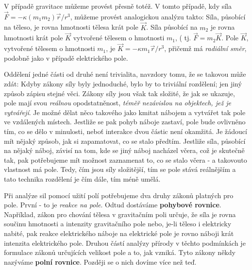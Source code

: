     V případě gravitace můžeme provést přesně totéž. V tomto případě, kdy síla \(\vec{F} = - \kappa 
    (m_1m_2)\vec{r}/r^3\), můžeme provést analogickou analýzu takto: Síla, působící na těleso, je 
    rovna hmotnosti tělesa krát pole \(\vec{K}\). Síla působící na \(m_2\) je rovna hmotnosti krát 
    pole \(\vec{K}\) vytvořené tělesem o hmotnosti \(m_1\), ( tj. \(\vec{F}=m_2\vec{K}\). Pole 
    \(\vec{K}\), vytvořené tělesem o hmotnosti \(m_1\), je \(\vec{K}= -\kappa m_1\vec{r}/r^3\), 
    přičemž má \emph{radiální směr}, podobně jako v případě elektrického pole.
    
    Oddělení jedné části od druhé není trivialita, navzdory tomu, že se takovou může zdát: Kdyby 
    zákony síly byly jednoduché, bylo by to triviální rozdělení; jen jiný způsob zápisu stejné 
    věci. Zákony síly jsou však tak složité, že jak se ukazuje, pole mají svou \emph{reálnou} 
    opodstatněnost, \emph{téměř nezávislou na objektech, jež je vytvářejí}. Je možné dělat něco 
    takového jako kmitat nábojem a vytvářet tak pole ve vzdálených místech. Jestliže se pak pohyb 
    náboje zastaví, pole bude ovlivněno tím, co se dělo v minulosti, neboť interakce dvou částic 
    není okamžitá. Je žádoucí mít nějaký způsob, jak si zapamatovat, co se stalo předtím. Jestliže 
    síla, působící na nějaký náboj, závisí na tom, kde se jiný náboj nacházel včera, což je 
    skutečně tak, pak potřebujeme mít možnost zaznamenat to, co se stalo včera - a takovouto 
    vlastnost má pole. Tedy, čím jsou síly složitější, tím se pole stává reálnějším a tato technika 
    rozdělení je čím dále, tím méně umělá.
    
    Při analýze sil pomocí užití polí potřebujeme dva druhy zákonů platných pro pole. První - to je 
    \emph{reakce na pole}. Odtud dostáváme \textbf{pohybové rovnice}. Například, zákon pro chování 
    tělesa v gravitačním poli určuje, že síla je rovna součinu hmotnosti a intenzity gravitačního 
    pole nebo, je-li těleso i elektricky nabité, pak reakce elektrického náboje na elektrické pole 
    je rovno náboji krát intenzita elektrického pole. Druhou částí analýzy přírody v těchto 
    podmínkách je formulace zákonů určujících velikost pole a to, jak vzniká. Tyto zákony někdy 
    nazýváme \textbf{polní rovnice}. Později se o nich dovíme více než teď.
    
